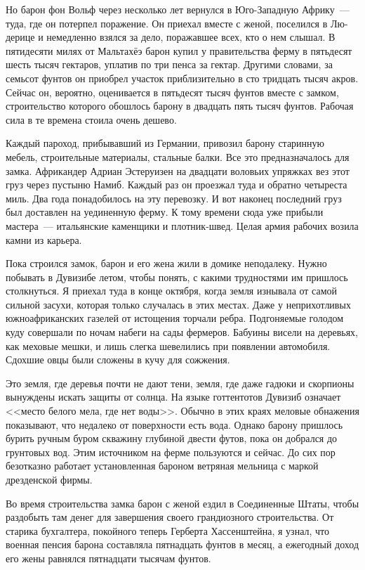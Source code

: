 \documentclass[12pt,a4paper,twoside,openany,svgnames]{memoir}
\begin{document}
Но барон фон Вольф через несколько лет вернулся в Юго-Западную Африку~--- туда, где он потерпел поражение. Он приехал вместе с женой, поселился в Лю-дерице и немедленно взялся за дело, поражавшее всех, кто о нем слышал. В пятидесяти милях от Мальтахёэ барон купил у правительства ферму в пятьдесят шесть тысяч гектаров, уплатив по три пенса за гектар. Другими словами, за семьсот фунтов он приобрел участок приблизительно в сто тридцать тысяч акров. Сейчас он, вероятно, оценивается в пятьдесят тысяч фунтов вместе с замком, строительство которого обошлось барону в двадцать пять тысяч фунтов. Рабочая сила в те времена стоила очень дешево.

Каждый пароход, прибывавший из Германии, привозил барону старинную мебель, строительные материалы, стальные балки. Все это предназначалось для замка. Африкандер Адриан Эстеруизен на двадцати воловьих упряжках вез этот груз через пустыню Намиб. Каждый раз он проезжал туда и обратно четыреста миль. Два года понадобилось на эту перевозку. И вот наконец последний груз был доставлен на уединенную ферму. К тому времени сюда уже прибыли мастера~--- итальянские каменщики и плотник-швед. Целая армия рабочих возила камни из карьера.

Пока строился замок, барон и его жена жили в домике неподалеку. Нужно побывать в Дувизибе летом, чтобы понять, с какими трудностями им пришлось столкнуться. Я приехал туда в конце октября, когда земля изнывала от самой сильной засухи, которая только случалась в этих местах. Даже у неприхотливых южноафриканских газелей от истощения торчали ребра. Подгоняемые голодом куду совершали по ночам набеги на сады фермеров. Бабуины висели на деревьях, как меховые мешки, и лишь слегка шевелились при появлении автомобиля. Сдохшие овцы были сложены в кучу для сожжения.

Это земля, где деревья почти не дают тени, земля, где даже гадюки и скорпионы вынуждены искать защиты от солнца. На языке готтентотов Дувизиб означает <<место белого мела, где нет воды>>. Обычно в этих краях меловые обнажения показывают, что недалеко от поверхности есть вода. Однако барону пришлось бурить ручным буром скважину глубиной двести футов, пока он добрался до грунтовых вод. Этим источником на ферме пользуются и сейчас. До сих пор безотказно работает установленная бароном ветряная мельница с маркой дрезденской фирмы.

Во время строительства замка барон с женой ездил в Соединенные Штаты, чтобы раздобыть там денег для завершения своего грандиозного строительства. От старика бухгалтера, покойного теперь Герберта Хассенштейна, я узнал, что военная пенсия барона составляла пятнадцать фунтов в месяц, а ежегодный доход его жены равнялся пятнадцати тысячам фунтов.
\end{document}
